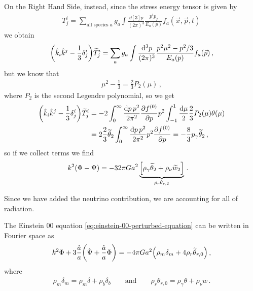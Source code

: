 \documentclass[main.tex]{subfiles}
\begin{document}

On the Right Hand Side, instead, since the stress energy tensor is given by 
%
\begin{align}
T^{i}_{j} = \sum _{\text{all species \(a\)}} g_{a}
\int  \frac{ \dd[3]{p}}{(2 \pi )^3} 
\frac{p^{i}p_{j}}{E_{a}(p)} f_a (\vec{x}, \vec{p}, t)
\,
\end{align}
%
we obtain 
%
\begin{align}
\qty(\hat{k}_{i} \hat{k}^{j} - \frac{1}{3} \delta^{i}_{j})
\widetilde{T}^{i}_{j} 
= \sum _{a} g_{a} \int  \frac{\dd[3]{p}}{(2\pi )^3} \frac{p^2\mu^2 - p^2/3}{E_a (p)} f_a (\vec{p})
\,,
\end{align}
%
but we know that 
%
\begin{align}
\mu^2 - \frac{1}{3} = \frac{2}{3} P_2 (\mu )
\,,
\end{align}
%
where \(P_2\) is the second Legendre polynomial, so we get 
%
\begin{subequations}
\begin{align}
\qty(\hat{k}_{i} \hat{k}^{j} - \frac{1}{3} \delta^{i}_{j})
\widetilde{T}^{i}_{j} &=
-2 \int_{0}^{ \infty } \frac{ \dd{p} p^2}{2\pi^2} \pdv{f^{(0)}}{p}p^2
\int_{-1}^{1} \frac{ \dd{\mu }}{2} \frac{2}{3} P_2 (\mu ) \theta (\mu )  \\
&= 2 \frac{2}{3} \widetilde{\theta}_{2} \int_{0}^{ \infty } \frac{ \dd{p}p^2}{2 \pi^2} p^2 \pdv{f^{(0)}}{p} = - \frac{8}{3} p_{\gamma } \widetilde{\theta}_{2}
\,,
\end{align}
\end{subequations}
%
so if we collect terms we find 
%
\begin{align} \label{eq:radiation-temperature-perturbation-term}
k^2 \qty(\Phi - \Psi ) &= - 32 \pi G a^2 
\underbrace{\qty[\rho_{\gamma } \widetilde{\theta}_{2} + \rho_{\nu } \widetilde{w}_{2}] }_{\rho_{r} \theta_{r, 2}} 
\,.
\end{align}

Since we have added the neutrino contribution, we are accounting for all of radiation. 

The Einstein 00 equation \eqref{eq:einstein-00-perturbed-equation} can be written in Fourier space as 
%
\begin{align}
k^2 \Phi + 3 \frac{\dot{a}}{a} \qty(\dot{\Psi} + \frac{\dot{a}}{a} \Phi )
= -4 \pi G a^2 \qty(\rho_{m } \delta_{m} + 4 \rho_{r} \widetilde{\theta}_{r, 0}) 
\,,
\end{align}
%
where 
%
\begin{align}
\rho_{m} \delta_{m} = \rho_{m} \delta + \rho_{b} \delta_{b} 
\qquad \text{and} \qquad
\rho_{r} \theta_{r, 0} = \rho_{\gamma } \theta + \rho_{\nu } w
\,.
\end{align}
\end{document}
